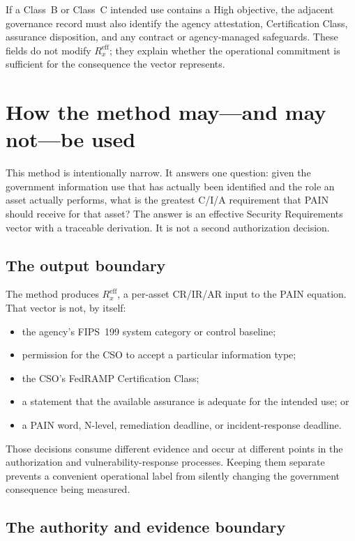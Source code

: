 \documentclass[11pt]{article}
\begin{document}
If a Class~B or Class~C intended use contains a High objective, the adjacent
governance record must also identify the agency attestation, Certification Class,
assurance disposition, and any contract or agency-managed safeguards. These fields
do not modify $R_x^{\mathrm{eff}}$; they explain whether the operational commitment
is sufficient for the consequence the vector represents.

\section{How the method may---and may not---be used}

This method is intentionally narrow. It answers one question: given the
government information use that has actually been identified and the role an asset
actually performs, what is the greatest C/I/A requirement that PAIN should receive
for that asset? The answer is an effective Security Requirements vector with a
traceable derivation. It is not a second authorization decision.

\subsection{The output boundary}

The method produces $R_x^{\mathrm{eff}}$, a per-asset CR/IR/AR input to the PAIN
equation. That vector is not, by itself:

\begin{itemize}[leftmargin=1.5em]
\item the agency's FIPS~199 system category or control baseline;
\item permission for the CSO to accept a particular information type;
\item the CSO's FedRAMP Certification Class;
\item a statement that the available assurance is adequate for the intended use;
  or
\item a PAIN word, N-level, remediation deadline, or incident-response deadline.
\end{itemize}

Those decisions consume different evidence and occur at different points in the
authorization and vulnerability-response processes. Keeping them separate prevents
a convenient operational label from silently changing the government consequence
being measured.

\subsection{The authority and evidence boundary}
\end{document}
